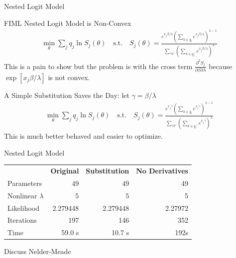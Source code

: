 \begin{frame}{Nested Logit Model}
\begin{exampleblock}{FIML Nested Logit Model is Non-Convex}
\begin{eqnarray*}
\min_{\theta} \sum_j q_j \ln S_j(\theta) \quad \mbox{s.t.} \quad  S_j(\theta) = \frac{e^{x_j \beta/ \lambda}( \sum_{k \in g_l} e^{x_j \beta/ \lambda})^{\lambda-1}}{\sum_{\forall l'} ( \sum_{k \in g_l'} e^{x_j \beta/ \lambda})^{\lambda} }
\end{eqnarray*}
This is a pain to show but the problem is with the cross term $\frac{\partial^2 S_j}{\partial \beta \partial \lambda}$ because $\exp[x_j \beta / \lambda]$ is not convex.
\end{exampleblock}
\begin{exampleblock}{A Simple Substitution Saves the Day:  let $\gamma = \beta / \lambda$}
\begin{eqnarray*}
\min_{\theta} \sum_j q_j \ln S_j(\theta) \quad \mbox{s.t.} \quad  
S_j(\theta) = \frac{e^{x_j \gamma}( \sum_{k \in g_l} e^{x_j \gamma})^{\lambda-1}}{\sum_{\forall l'} ( \sum_{k \in g_l'} e^{x_j \gamma})^{\lambda} }
\end{eqnarray*}
This is much better behaved and easier to optimize.
\end{exampleblock}
\end{frame}

\begin{frame}{Nested Logit Model}
\begin{center}
\begin{tabular}{lrrr}
&\bf{Original} & \bf{Substitution} & \bf{No Derivatives} \\
Parameters &49& 49&49\\
Nonlinear $\lambda$ &5 &5 &5\\
Likelihood & 2.279448 &2.279448  & 2.27972\\
Iterations &197 &146 & 352\\
Time & 59.0 s & 10.7 s & 192s  \\
\end{tabular}
\end{center}
Discuss Nelder-Meade
\end{frame}

